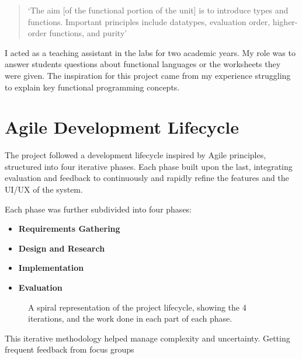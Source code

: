 \begin{quote}
`The aim [of the functional portion of the unit] is to introduce types and functions. Important principles include datatypes, evaluation order, higher-order functions, and purity' \cite{COMS10016}
\end{quote}

\noindent I acted as a teaching assistant in the labs for two academic years. My role was to answer students questions about functional languages or the worksheets they were given. The inspiration for this project came from my experience struggling to explain key functional programming concepts. 

\section{Agile Development Lifecycle}
The project followed a development lifecycle inspired by Agile principles\cite{agilemanifesto2001}, structured into four iterative phases. Each phase built upon the last, integrating evaluation and feedback to continuously and rapidly refine the features and the UI/UX of the system. 

Each phase was further subdivided into four phases:

\begin{itemize}
    \item \textbf{Requirements Gathering}
    \item \textbf{Design and Research}
    \item \textbf{Implementation}
    \item \textbf{Evaluation}
\end{itemize}

\begin{figure}[t]
    \centering
    \caption{A spiral representation of the project lifecycle, showing the 4 iterations, and the work done in each part of each phase. }\label{fig:spiral}
\end{figure}

This iterative methodology helped manage complexity and uncertainty. Getting frequent feedback from focus groups 